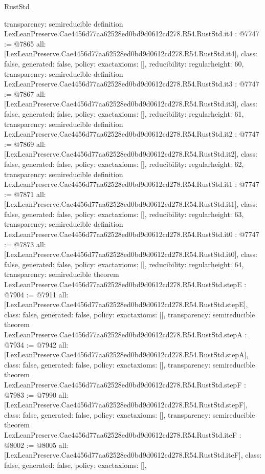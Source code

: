\begin{lexlean}{RustStd}
\begin{coremodule}
{  transparency: semireducible
}
definition LexLeanPreserve.Cae4456d77aa62528ed0bd9d0612cd278.R54.RustStd.it4 : @7747 := @7865 {
  all: [LexLeanPreserve.Cae4456d77aa62528ed0bd9d0612cd278.R54.RustStd.it4],
  class: false,
  generated: false,
  policy: exact{axioms: []},
  reducibility: regular{height: 60},
  transparency: semireducible
}
definition LexLeanPreserve.Cae4456d77aa62528ed0bd9d0612cd278.R54.RustStd.it3 : @7747 := @7867 {
  all: [LexLeanPreserve.Cae4456d77aa62528ed0bd9d0612cd278.R54.RustStd.it3],
  class: false,
  generated: false,
  policy: exact{axioms: []},
  reducibility: regular{height: 61},
  transparency: semireducible
}
definition LexLeanPreserve.Cae4456d77aa62528ed0bd9d0612cd278.R54.RustStd.it2 : @7747 := @7869 {
  all: [LexLeanPreserve.Cae4456d77aa62528ed0bd9d0612cd278.R54.RustStd.it2],
  class: false,
  generated: false,
  policy: exact{axioms: []},
  reducibility: regular{height: 62},
  transparency: semireducible
}
definition LexLeanPreserve.Cae4456d77aa62528ed0bd9d0612cd278.R54.RustStd.it1 : @7747 := @7871 {
  all: [LexLeanPreserve.Cae4456d77aa62528ed0bd9d0612cd278.R54.RustStd.it1],
  class: false,
  generated: false,
  policy: exact{axioms: []},
  reducibility: regular{height: 63},
  transparency: semireducible
}
definition LexLeanPreserve.Cae4456d77aa62528ed0bd9d0612cd278.R54.RustStd.it0 : @7747 := @7873 {
  all: [LexLeanPreserve.Cae4456d77aa62528ed0bd9d0612cd278.R54.RustStd.it0],
  class: false,
  generated: false,
  policy: exact{axioms: []},
  reducibility: regular{height: 64},
  transparency: semireducible
}
theorem LexLeanPreserve.Cae4456d77aa62528ed0bd9d0612cd278.R54.RustStd.stepE : @7904 := @7911 {
  all: [LexLeanPreserve.Cae4456d77aa62528ed0bd9d0612cd278.R54.RustStd.stepE],
  class: false,
  generated: false,
  policy: exact{axioms: []},
  transparency: semireducible
}
theorem LexLeanPreserve.Cae4456d77aa62528ed0bd9d0612cd278.R54.RustStd.stepA : @7934 := @7942 {
  all: [LexLeanPreserve.Cae4456d77aa62528ed0bd9d0612cd278.R54.RustStd.stepA],
  class: false,
  generated: false,
  policy: exact{axioms: []},
  transparency: semireducible
}
theorem LexLeanPreserve.Cae4456d77aa62528ed0bd9d0612cd278.R54.RustStd.stepF : @7983 := @7990 {
  all: [LexLeanPreserve.Cae4456d77aa62528ed0bd9d0612cd278.R54.RustStd.stepF],
  class: false,
  generated: false,
  policy: exact{axioms: []},
  transparency: semireducible
}
theorem LexLeanPreserve.Cae4456d77aa62528ed0bd9d0612cd278.R54.RustStd.iteF : @8002 := @8005 {
  all: [LexLeanPreserve.Cae4456d77aa62528ed0bd9d0612cd278.R54.RustStd.iteF],
  class: false,
  generated: false,
  policy: exact{axioms: []},
}
\end{coremodule}
\end{lexlean}
